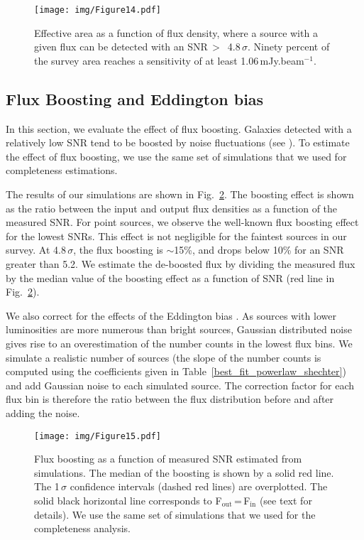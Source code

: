 \documentclass[longauth]{aa}
\begin{document}
\begin{figure}
\centering
\resizebox{\hsize}{!} {
\texttt{[image: img/Figure14.pdf]}
}
\caption{Effective area as a function of flux density, where a source with a given flux can be detected with an SNR\,$>$\, 4.8\,$\sigma$. Ninety percent of the survey area reaches a sensitivity of at least 1.06\,mJy.beam$^{-1}$.}
   \label{Effective_area}
\end{figure}



\subsection{Flux Boosting and Eddington bias}

In this section, we evaluate the effect of flux boosting. Galaxies detected with a relatively low SNR tend to be boosted by noise fluctuations (see \citealt{Hogg1998,Coppin2005, Scott2002}). To estimate the effect of flux boosting, we use the same set of simulations that we used for completeness estimations. 

The results of our simulations are shown in Fig.~\ref{Flux_boosting}. The boosting effect is shown as the ratio between the input and output flux densities as a function of the measured SNR. For point sources, we observe the well-known flux boosting effect for the lowest SNRs. This effect is not negligible for the faintest sources in our survey. At 4.8\,$\sigma$, the flux boosting is $\sim$15\%, and drops below 10\% for an SNR greater than 5.2. We estimate the de-boosted flux by dividing the measured flux by the median value of the boosting effect as a function of SNR (red line in Fig.~\ref{Flux_boosting}).

We also correct for the effects of the Eddington bias \citep{Eddington1913}. As sources with lower luminosities are more numerous than bright sources, Gaussian distributed noise gives rise to an overestimation of the number counts in the lowest flux bins. We simulate a realistic number of sources (the slope of the number counts is computed using the coefficients given in Table~\ref{best_fit_powerlaw_shechter}) and add Gaussian noise to each simulated source. The correction factor for each flux bin is therefore the ratio between the flux distribution before and after adding the noise.

\begin{figure}
 \centering
   \texttt{[image: img/Figure15.pdf]}
      \caption{Flux boosting as a function of measured SNR estimated from simulations. The median of the boosting is shown by a solid red line. The 1\,$\sigma$ confidence intervals (dashed red lines) are overplotted. The solid black horizontal line corresponds to F$_\text{out}$\,=\,F$_\text{in}$ (see text for details). We use the same set of simulations that we used for the completeness analysis.}
         \label{Flux_boosting}
   \end{figure}
\end{document}
